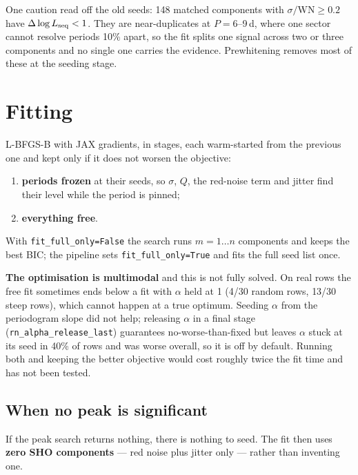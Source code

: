 \documentclass[11pt]{article}
\newcommand{\code}[1]{\texttt{#1}}
\begin{document}
One caution read off the old seeds: 148 matched components with $\sigma/\mathrm{WN} \ge 0.2$ have
$\Delta\log L_{\rm seq} < 1$. They are near-duplicates at $P = 6$--9\,d, where one sector cannot
resolve periods 10\% apart, so the fit splits one signal across two or three components and
no single one carries the evidence. Prewhitening removes most of these at the seeding stage.

\section{Fitting}

L-BFGS-B with JAX gradients, in stages, each warm-started from the previous one and kept only
if it does not worsen the objective:
\begin{enumerate}
\item \textbf{periods frozen} at their seeds, so $\sigma$, $Q$, the red-noise term and jitter
  find their level while the period is pinned;
\item \textbf{everything free}.
\end{enumerate}
With \code{fit\_full\_only=False} the search runs $m = 1 \ldots n$ components and keeps the
best BIC; the pipeline sets \code{fit\_full\_only=True} and fits the full seed list once.

\textbf{The optimisation is multimodal} and this is not fully solved. On real rows the free
fit sometimes ends below a fit with $\alpha$ held at 1 (4/30 random rows, 13/30 steep rows),
which cannot happen at a true optimum. Seeding $\alpha$ from the periodogram slope did not
help; releasing $\alpha$ in a final stage
(\code{rn\_alpha\_release\_last}) guarantees no-worse-than-fixed but leaves $\alpha$ stuck at
its seed in 40\% of rows and was worse overall, so it is off by default. Running both and
keeping the better objective would cost roughly twice the fit time and has not been tested.

\subsection{When no peak is significant}

If the peak search returns nothing, there is nothing to seed. The fit then uses
\textbf{zero SHO components} --- red noise plus jitter only --- rather than inventing one.
\end{document}
